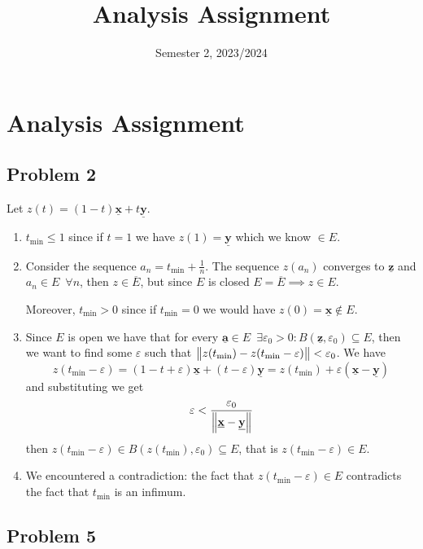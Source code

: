 \documentclass[12pt]{extarticle}
\title{Analysis Assignment}
\date{Semester 2, 2023/2024}
\renewcommand{\vec}[1]{\underline{\mathbf{#1}}}
\newcommand{\tmin}{t_{\text{min}}}
\begin{document}
\section*{Analysis Assignment}

\subsection*{Problem 2}

Let $z(t) = (1-t) \vec x + t \vec y$.

\begin{enumerate}[label=\alph*.]
    \item $t_{\text{min}} \leq 1$ since if $t = 1$ we have $z(1) = \vec{y}$ which we know $\in E$.
    \item Consider the sequence $a_n = t_{\text{min}} + \frac{1}{n}$. The sequence $z(a_n)$ converges to $\vec z$ and $a_n \in E \enspace \forall n$, then $z \in \overline{E}$, but since $E$ is closed $E = \overline{E} \implies z \in E$.

          Moreover, $\tmin > 0$ since if $\tmin = 0$ we would have $z(0) = \vec x \notin E$.
    \item Since $E$ is open we have that for every $\vec a \in E \enspace \exists \varepsilon_0 > 0 : B(\vec z, \varepsilon_0) \subseteq E$, then we want to find some $\varepsilon$ such that $\norm {z(\tmin) - z(\tmin- \varepsilon)} < \varepsilon_0$.
          We have
          $$
              z(\tmin - \varepsilon) = (1 - t +\varepsilon)\vec x + (t-\varepsilon)\vec y = z(\tmin) + \varepsilon(\vec x - \vec y)
          $$
          and substituting we get
          $$
              \varepsilon < \frac{\varepsilon_0}{\norm{\vec x - \vec y}}
          $$
          then $z(\tmin - \varepsilon) \in B(z(\tmin), \varepsilon_0) \subseteq E$, that is $z(\tmin - \varepsilon) \in E$.

    \item We encountered a contradiction: the fact that $z(\tmin - \varepsilon) \in E$ contradicts the fact that $\tmin$ is an infimum.
\end{enumerate}

\subsection*{Problem 5}
\end{document}
